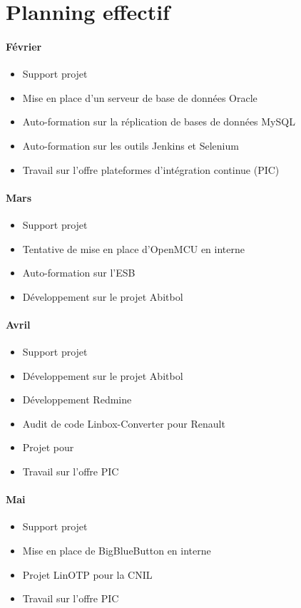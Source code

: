 \section{Planning effectif}

\paragraph{Février}
\begin{itemize}
	\item Support projet
	\item Mise en place d'un serveur de base de données Oracle
	\item Auto-formation sur la réplication de bases de données MySQL
	\item Auto-formation sur les outils Jenkins et Selenium
	\item Travail sur l'offre \og plateformes d'intégration continue \fg{} (PIC)
\end{itemize}

\paragraph{Mars}
\begin{itemize}
	\item Support projet
	\item Tentative de mise en place d'OpenMCU en interne
	\item Auto-formation sur l'ESB \apetals{}
	\item Développement sur le projet Abitbol
\end{itemize}

\paragraph{Avril}
\begin{itemize}
	\item Support projet
	\item Développement sur le projet Abitbol
	\item Développement Redmine
	\item Audit de code Linbox-Converter pour Renault
	\item Projet \acentreon{} pour \adacast{}
	\item Travail sur l'offre PIC
\end{itemize}

\paragraph{Mai}
\begin{itemize}
	\item Support projet
	\item Mise en place de BigBlueButton en interne
	\item Projet LinOTP pour la CNIL
	\item Travail sur l'offre PIC
\end{itemize}

